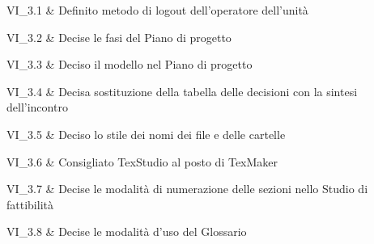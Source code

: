 VI\_3.1 & Definito metodo di logout dell'operatore dell'unità

\tabularnewline
VI\_3.2 & Decise le fasi del Piano di progetto

\tabularnewline
VI\_3.3 & Deciso il modello nel Piano di progetto

\tabularnewline
VI\_3.4 & Decisa sostituzione della tabella delle decisioni con la sintesi dell'incontro

\tabularnewline
VI\_3.5 & Deciso lo stile dei nomi dei file e delle cartelle

\tabularnewline
VI\_3.6 & Consigliato TexStudio al posto di TexMaker

\tabularnewline
VI\_3.7 & Decise le modalità di numerazione delle sezioni nello Studio di fattibilità

\tabularnewline
VI\_3.8 & Decise le modalità d'uso del Glossario